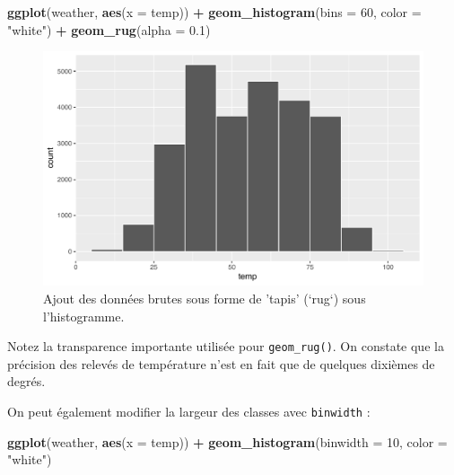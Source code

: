\documentclass[a4paperpaper,]{article}
\newenvironment{Shaded}{\begin{snugshade}}{\end{snugshade}}
\newcommand{\KeywordTok}[1]{\textcolor[rgb]{0.13,0.29,0.53}{\textbf{#1}}}
\newcommand{\DataTypeTok}[1]{\textcolor[rgb]{0.13,0.29,0.53}{#1}}
\newcommand{\DecValTok}[1]{\textcolor[rgb]{0.00,0.00,0.81}{#1}}
\newcommand{\FloatTok}[1]{\textcolor[rgb]{0.00,0.00,0.81}{#1}}
\newcommand{\StringTok}[1]{\textcolor[rgb]{0.31,0.60,0.02}{#1}}
\newcommand{\OperatorTok}[1]{\textcolor[rgb]{0.81,0.36,0.00}{\textbf{#1}}}
\newcommand{\NormalTok}[1]{#1}
\theoremstyle{definition}
\theoremstyle{definition}
\theoremstyle{definition}
\theoremstyle{remark}
\begin{document}
\begin{Shaded}
\begin{Highlighting}[]
\KeywordTok{ggplot}\NormalTok{(weather, }\KeywordTok{aes}\NormalTok{(}\DataTypeTok{x =}\NormalTok{ temp)) }\OperatorTok{+}
\StringTok{  }\KeywordTok{geom_histogram}\NormalTok{(}\DataTypeTok{bins =} \DecValTok{60}\NormalTok{, }\DataTypeTok{color =} \StringTok{"white"}\NormalTok{) }\OperatorTok{+}
\StringTok{  }\KeywordTok{geom_rug}\NormalTok{(}\DataTypeTok{alpha =} \FloatTok{0.1}\NormalTok{)}
\end{Highlighting}
\end{Shaded}

\begin{figure}[htpb]

{\centering \includegraphics[width=0.9\linewidth]{figure/unnamed-chunk-50-1} 

}

\caption{Ajout des données brutes sous forme de 'tapis' (`rug`) sous l'histogramme.}\label{fig:unnamed-chunk-50}
\end{figure}

Notez la transparence importante utilisée pour \texttt{geom\_rug()}. On
constate que la précision des relevés de température n'est en fait que
de quelques dixièmes de degrés.

On peut également modifier la largeur des classes avec \texttt{binwidth}
:

\begin{Shaded}
\begin{Highlighting}[]
\KeywordTok{ggplot}\NormalTok{(weather, }\KeywordTok{aes}\NormalTok{(}\DataTypeTok{x =}\NormalTok{ temp)) }\OperatorTok{+}
\StringTok{  }\KeywordTok{geom_histogram}\NormalTok{(}\DataTypeTok{binwidth =} \DecValTok{10}\NormalTok{, }\DataTypeTok{color =} \StringTok{"white"}\NormalTok{)}
\end{Highlighting}
\end{Shaded}
\end{document}
